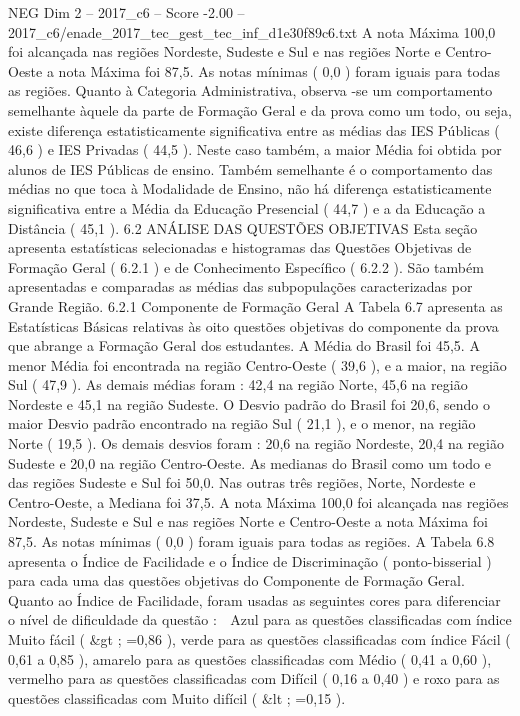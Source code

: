\begin{textsample}{NEG Dim 2 – 2017\_c6 – Score -2.00 – 2017\_c6/enade\_2017\_tec\_gest\_tec\_inf\_d1e30f89c6.txt}
A nota Máxima 100,0 foi alcançada nas regiões Nordeste, Sudeste e Sul e nas regiões Norte e Centro-Oeste a nota Máxima foi 87,5.
As notas mínimas ( 0,0 ) foram iguais para todas as regiões.
Quanto à Categoria Administrativa, observa -se um comportamento semelhante àquele da parte de Formação Geral e da prova como um todo, ou seja, existe diferença estatisticamente significativa entre as médias das IES Públicas ( 46,6 ) e IES Privadas ( 44,5 ).
Neste caso também, a maior Média foi obtida por alunos de IES Públicas de ensino.
Também semelhante é o comportamento das médias no que toca à Modalidade de Ensino, não há diferença estatisticamente significativa entre a Média da Educação Presencial ( 44,7 ) e a da Educação a Distância ( 45,1 ). 6.2 ANÁLISE DAS QUESTÕES OBJETIVAS Esta seção apresenta estatísticas selecionadas e histogramas das Questões Objetivas de Formação Geral ( 6.2.1 ) e de Conhecimento Específico ( 6.2.2 ).
São também apresentadas e comparadas as médias das subpopulações caracterizadas por Grande Região. 6.2.1 Componente de Formação Geral A Tabela 6.7 apresenta as Estatísticas Básicas relativas às oito questões objetivas do componente da prova que abrange a Formação Geral dos estudantes.
A Média do Brasil foi 45,5.
A menor Média foi encontrada na região Centro-Oeste ( 39,6 ), e a maior, na região Sul ( 47,9 ).
As demais médias foram : 42,4 na região Norte, 45,6 na região Nordeste e 45,1 na região Sudeste.
O Desvio padrão do Brasil foi 20,6, sendo o maior Desvio padrão encontrado na região Sul ( 21,1 ), e o menor, na região Norte ( 19,5 ).
Os demais desvios foram : 20,6 na região Nordeste, 20,4 na região Sudeste e 20,0 na região Centro-Oeste.
As medianas do Brasil como um todo e das regiões Sudeste e Sul foi 50,0.
Nas outras três regiões, Norte, Nordeste e Centro-Oeste, a Mediana foi 37,5.
A nota Máxima 100,0 foi alcançada nas regiões Nordeste, Sudeste e Sul e nas regiões Norte e Centro-Oeste a nota Máxima foi 87,5.
As notas mínimas ( 0,0 ) foram iguais para todas as regiões.
A Tabela 6.8 apresenta o Índice de Facilidade e o Índice de Discriminação ( ponto-bisserial ) para cada uma das questões objetivas do Componente de Formação Geral.
Quanto ao Índice de Facilidade, foram usadas as seguintes cores para diferenciar o nível de dificuldade da questão :  Azul para as questões classificadas com índice Muito fácil ( \&gt ; =0,86 ), verde para as questões classificadas com índice Fácil ( 0,61 a 0,85 ), amarelo para as questões classificadas com Médio ( 0,41 a 0,60 ), vermelho para as questões classificadas com Difícil ( 0,16 a 0,40 ) e roxo para as questões classificadas com Muito difícil ( \&lt ; =0,15 ).

\end{textsample}

